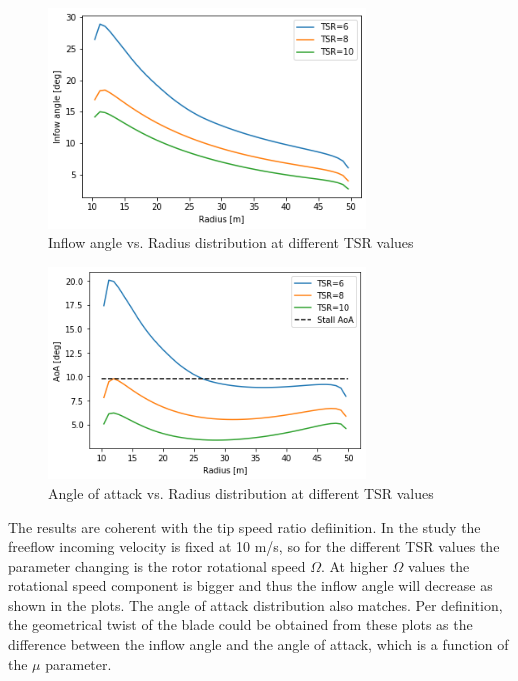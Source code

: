 \begin{figure}[htbp]
\includegraphics[width=0.75\textwidth]{./img/Inflow_plt_alligned.png}
\caption{Inflow angle vs. Radius distribution at different TSR values}
\centering
\label{Inflow_alligned}
\end{figure}

\begin{figure}[htbp]
\includegraphics[width=0.75\textwidth]{./img/AoA_plt_alligned.png}
\caption{Angle of attack vs. Radius distribution at different TSR values}
\centering
\label{AoA_alligned}
\end{figure}

The results are coherent with the tip speed ratio defiinition. In the study the freeflow incoming velocity is fixed at 10 m/s, so for the different TSR values the parameter changing is the rotor rotational speed $\Omega $. At higher $\Omega $ values the rotational speed component is bigger and thus the inflow angle will decrease as shown in the plots. The angle of attack distribution also matches. Per definition, the geometrical twist of the blade could be obtained from these plots as the difference between the inflow angle and the angle of attack, which is a function of the $\mu$ parameter. \\

